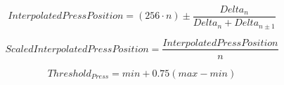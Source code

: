 \documentclass{article}
\begin{document}
\[ Interpolated Press Position = (256 \cdot n) \pm \frac{Delta_{n}}{Delta_{n} + Delta_{n \pm 1}} \]
\pagebreak

\[ Scaled Interpolated Press Position = \frac{InterpolatedPressPosition}{n} \]
\pagebreak

\[ Threshold_{Press} = min + 0.75 (max - min) \]
\pagebreak
\end{document}
